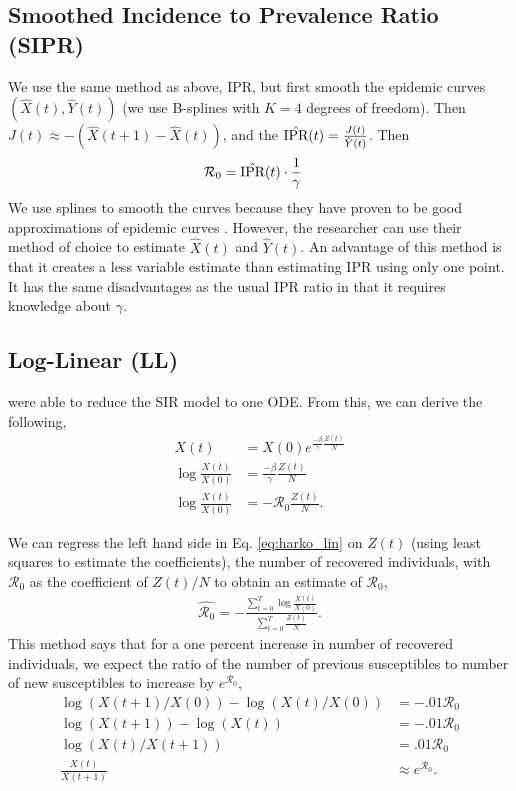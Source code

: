\documentclass[12pt]{article}
\newcommand{\rr}{\ensuremath{\mathcal{R}_0}}
\begin{document}
\subsection{Smoothed Incidence to Prevalence Ratio (SIPR)}
We use the same method as above, IPR, but first smooth the epidemic curves $\left(\hat{X}(t), \hat{Y}(t) \right)$ (we use B-splines with $K=4$ degrees of freedom).  Then  $J(t) \approx -(\hat{X}(t+1) - \hat{X}(t))$, and the $\hat{\textnormal{IPR}}(t) = \frac{J(t)}{\hat{Y}(t)}$.  Then
\begin{align*}
\rr &= \hat{\textnormal{IPR}}(t) \cdot \frac{1}{\gamma}
\end{align*}
We use splines to smooth the curves because they  have proven to be good approximations of epidemic curves \citep{brooks2015}.  However, the researcher can use their method of choice to estimate $\hat{X}(t)$ and $\hat{Y}(t)$.  An advantage of this method is that it creates a less variable estimate than estimating IPR using only one point.  It has the same disadvantages as the usual IPR ratio in that it requires knowledge about $\gamma$.

\subsection{Log-Linear (LL)}
\cite{harko2014exact} were able to reduce the SIR model to one ODE.  From this, we can derive the following,
\begin{align}
  X(t) &=  X(0) e^{\frac{-\beta}{\gamma}\frac{Z(t)}{N}} \nonumber\\
  \log \frac{X(t)}{X(0)} &=  \frac{-\beta }{\gamma}\frac{Z(t)}{N} \nonumber\\
  \log \frac{X(t)}{X(0)} &=  -\rr \frac{Z(t)}{N}. \label{eq:harko_lin}
\end{align}

We can regress the left hand side in Eq. \ref{eq:harko_lin} on $Z(t)$ (using least squares to estimate the coefficients), the number of recovered individuals, with $\rr$ as the coefficient of $Z(t)/N$ to obtain an estimate of $\rr$,
\begin{align*}
  \hat{\rr} = -\frac{\sum_{t=0}^T \log \frac{ X(t)}{X(0)}}{\sum_{t=0}^T\frac{Z(t)}{N}}.
\end{align*}
This method says that for a one percent increase in number of recovered individuals, we expect the ratio of the number of previous susceptibles to number of new susceptibles to increase by $e^{\rr}$,
\begin{align*}
  \log \left ( X(t+1)/ X(0) \right ) - \log \left ( X(t)/X(0) \right ) &= - .01\rr\\
  \log \left ( X(t+1) \right ) - \log \left ( X(t) \right )  &=- .01\rr\\
  \log \left ( X(t) / X(t+1) \right ) &= .01\rr\\
  \frac{X(t)}{X(t+1)}  &\approx e^{\rr}.
\end{align*}
\end{document}
